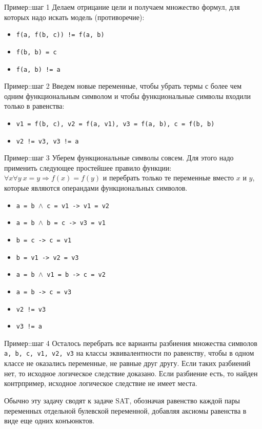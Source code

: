 \documentclass[hyperref={unicode=true}]{beamer}
\begin{document}
    \begin{frame}{Пример::шаг 1}
    Делаем отрицание цели и получаем множество формул,
    для которых надо искать модель (противоречие):

    \begin{itemize}
    \item \texttt{f(a, f(b, c)) != f(a, b)}
    \item \texttt{f(b, b) = c}
    \item \texttt{f(a, b) != a}
    \end{itemize}
    \end{frame}

    \begin{frame}{Пример::шаг 2}
    Введем новые переменные, чтобы убрать термы с более чем одним
    функциональным символом и чтобы функциональные символы
    входили только в равенства:

    \begin{itemize}
    \item \texttt{v1 = f(b, c), v2 = f(a, v1),
        v3 = f(a, b), c = f(b, b)}
    \item \texttt{v2 != v3, v3 != a}
    \end{itemize}
    \end{frame}

    \begin{frame}{Пример::шаг 3}
    Уберем функциональные символы совсем. Для этого надо
    применить следующее простейшее правило функции:
    $\forall x \forall y ~ x = y \Rightarrow f(x) = f(y)$
    и перебрать только те переменные вместо $x$ и $y$,
    которые являются операндами функциональных символов.

    \begin{itemize}
    \item \texttt{a = b $\land$ c = v1 -> v1 = v2}
    \item \texttt{a = b $\land$ b = c -> v3 = v1}
    \item \texttt{b = c -> c = v1}
    \item \texttt{b = v1 -> v2 = v3}
    \item \texttt{a = b $\land$ v1 = b -> c = v2}
    \item \texttt{a = b -> c = v3}
    \item \texttt{v2 != v3}
    \item \texttt{v3 != a}
    \end{itemize}
    \end{frame}

    \begin{frame}{Пример::шаг 4}
    Осталось перебрать все варианты разбиения множества
    символов \texttt{a, b, c, v1, v2, v3} на классы
    эквивалентности по равенству, чтобы в одном классе
    не оказались переменные, не равные друг другу.
    Если таких разбиений нет, то исходное логическое
    следствие доказано. Если разбиение есть, то найден
    контрпример, исходное логическое следствие не имеет места.

    Обычно эту задачу сводят к задаче SAT, обозначая равенство
    каждой пары переменных отдельной булевской переменной,
    добавляя аксиомы равенства в виде еще одних конъюнктов.
    \end{frame}
\end{document}
